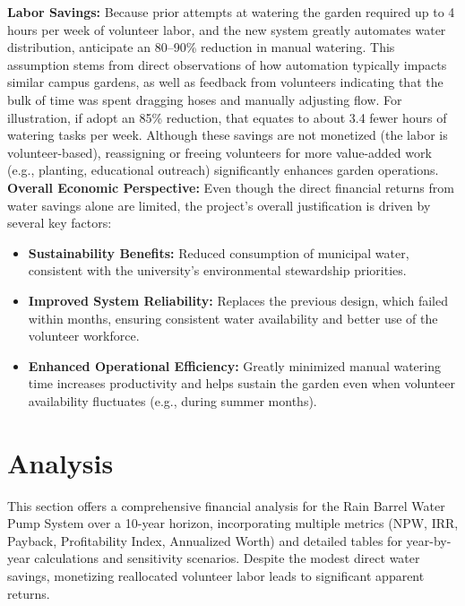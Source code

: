 \documentclass[12pt]{report}
\begin{document}
\noindent\textbf{Labor Savings:}  
Because prior attempts at watering the garden required up to 4 hours per week of volunteer labor, and the new system greatly automates water distribution, anticipate an 80--90\% reduction in manual watering. This assumption stems from direct observations of how automation typically impacts similar campus gardens, as well as feedback from volunteers indicating that the bulk of time was spent dragging hoses and manually adjusting flow. For illustration, if adopt an 85\% reduction, that equates to about 3.4 fewer hours of watering tasks per week. Although these savings are not monetized (the labor is volunteer-based), reassigning or freeing volunteers for more value-added work (e.g., planting, educational outreach) significantly enhances garden operations.
\newline\newline
\textbf{Overall Economic Perspective:}  
Even though the direct financial returns from water savings alone are limited, the project’s overall justification is driven by several key factors:
\begin{itemize}
    \item \textbf{Sustainability Benefits:} Reduced consumption of municipal water, consistent with the university’s environmental stewardship priorities.
    \item \textbf{Improved System Reliability:} Replaces the previous design, which failed within months, ensuring consistent water availability and better use of the volunteer workforce.
    \item \textbf{Enhanced Operational Efficiency:} Greatly minimized manual watering time increases productivity and helps sustain the garden even when volunteer availability fluctuates (e.g., during summer months).
\end{itemize}






\newpage
\section{Analysis}
\vspace{-0.5em}

This section offers a comprehensive financial analysis for the Rain Barrel Water Pump System over a 10-year horizon, incorporating multiple metrics (NPW, IRR, Payback, Profitability Index, Annualized Worth) and detailed tables for year-by-year calculations and sensitivity scenarios. Despite the modest direct water savings, monetizing reallocated volunteer labor leads to significant apparent returns.
\end{document}

